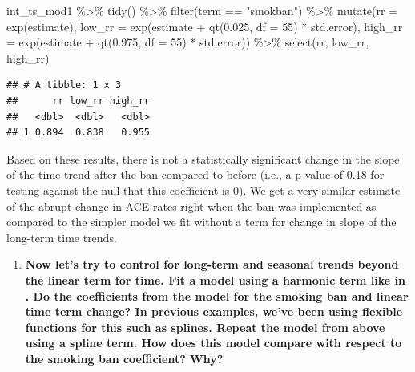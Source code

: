 \documentclass[
]{book}
\newenvironment{Shaded}{\begin{snugshade}}{\end{snugshade}}
\newcommand{\AttributeTok}[1]{\textcolor[rgb]{0.77,0.63,0.00}{#1}}
\newcommand{\DecValTok}[1]{\textcolor[rgb]{0.00,0.00,0.81}{#1}}
\newcommand{\FloatTok}[1]{\textcolor[rgb]{0.00,0.00,0.81}{#1}}
\newcommand{\FunctionTok}[1]{\textcolor[rgb]{0.00,0.00,0.00}{#1}}
\newcommand{\NormalTok}[1]{#1}
\newcommand{\SpecialCharTok}[1]{\textcolor[rgb]{0.00,0.00,0.00}{#1}}
\newcommand{\StringTok}[1]{\textcolor[rgb]{0.31,0.60,0.02}{#1}}
\providecommand{\tightlist}{%
  \setlength{\itemsep}{0pt}\setlength{\parskip}{0pt}}
\begin{document}
\begin{Shaded}
\begin{Highlighting}[]
\NormalTok{int\_ts\_mod1 }\SpecialCharTok{\%\textgreater{}\%} 
  \FunctionTok{tidy}\NormalTok{() }\SpecialCharTok{\%\textgreater{}\%} 
  \FunctionTok{filter}\NormalTok{(term }\SpecialCharTok{==} \StringTok{"smokban"}\NormalTok{) }\SpecialCharTok{\%\textgreater{}\%} 
  \FunctionTok{mutate}\NormalTok{(}\AttributeTok{rr =} \FunctionTok{exp}\NormalTok{(estimate), }
         \AttributeTok{low\_rr =} \FunctionTok{exp}\NormalTok{(estimate }\SpecialCharTok{+} \FunctionTok{qt}\NormalTok{(}\FloatTok{0.025}\NormalTok{, }\AttributeTok{df =} \DecValTok{55}\NormalTok{) }\SpecialCharTok{*}\NormalTok{ std.error), }
         \AttributeTok{high\_rr =} \FunctionTok{exp}\NormalTok{(estimate }\SpecialCharTok{+} \FunctionTok{qt}\NormalTok{(}\FloatTok{0.975}\NormalTok{, }\AttributeTok{df =} \DecValTok{55}\NormalTok{) }\SpecialCharTok{*}\NormalTok{ std.error)) }\SpecialCharTok{\%\textgreater{}\%} 
  \FunctionTok{select}\NormalTok{(rr, low\_rr, high\_rr)}
\end{Highlighting}
\end{Shaded}

\begin{verbatim}
## # A tibble: 1 x 3
##      rr low_rr high_rr
##   <dbl>  <dbl>   <dbl>
## 1 0.894  0.838   0.955
\end{verbatim}

Based on these results, there is not a statistically significant change in the slope of the time trend after the ban compared to before (i.e., a p-value of 0.18 for testing against the null that this coefficient is 0). We get a very similar estimate of the abrupt change in ACE rates right when the ban was implemented as compared to the simpler model we fit without a term for change in slope of the long-term time trends.

\begin{enumerate}
\def\labelenumi{\arabic{enumi}.}
\setcounter{enumi}{3}
\tightlist
\item
  \textbf{Now let's try to control for long-term and seasonal trends beyond the linear term for time. Fit a model using a harmonic term like in \citet{bernal2017interrupted}. Do the coefficients from the model for the smoking ban and linear time term change? In previous examples, we've been using flexible functions for this such as splines. Repeat the model from above using a spline term. How does this model compare with respect to the smoking ban coefficient? Why?}
\end{enumerate}
\end{document}
